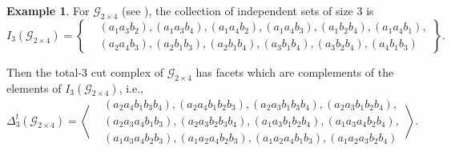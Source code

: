 \documentclass[11pt,reqno,a4paper]{amsart}
\theoremstyle{definition}
\newtheorem{example}{Example}[definition]
\theoremstyle{theorem}
\newcommand{\totalthreecut}{\Delta_{3}^t}
\newcommand{\lno}{\left(}
\newcommand{\rno}{\right)}
\newcommand{\lcu}{\left\{}
\newcommand{\rcu}{\right\}}
\theoremstyle{remark}
\begin{document}
    

\begin{example}
    For $\mathcal{G}_{2\times4}$ (see ), the collection of independent sets of size $3$ is
    $$I_3 \lno \mathcal{G}_{2\times4} \rno = \lcu \begin{split}
        &\lno a_1 a_3 b_2 \rno, \lno a_1 a_3 b_4 \rno, \lno a_1 a_4 b_2 \rno, \lno a_1 a_4 b_3 \rno, \lno a_1 b_2 b_4 \rno, \lno a_1 a_4 b_1 \rno,\\
        &\lno a_2 a_4 b_3 \rno, \lno a_2 b_1 b_3 \rno, \lno a_2 b_1 b_4 \rno, \lno a_3 b_1 b_4 \rno, \lno a_3 b_2 b_4 \rno, \lno a_4 b_1 b_3 \rno
    \end{split} \rcu.
    $$
    
    Then the total-3 cut complex of $\mathcal{G}_{2\times4}$ has facets which are complements of the elements of $I_3 \lno \mathcal{G}_{2\times4} \rno$, i.e., $$\totalthreecut \lno \mathcal{G}_{2\times4} \rno = \left\langle \begin{split}
        &\lno a_2 a_4 b_1 b_3 b_4 \rno,
        \lno a_2 a_4 b_1 b_2 b_3 \rno,
        \lno a_2 a_3 b_1 b_3 b_4 \rno,
        \lno a_2 a_3 b_1 b_2 b_4 \rno,\\
        &\lno a_2 a_3 a_4 b_1 b_3 \rno,
        \lno a_2 a_3 b_2 b_3 b_4 \rno,
        \lno a_1 a_3 b_1 b_2 b_4 \rno,
        \lno a_1 a_3 a_4 b_2 b_4 \rno,\\
        &\lno a_1 a_3 a_4 b_2 b_3 \rno,
        \lno a_1 a_2 a_4 b_2 b_3 \rno,
        \lno a_1 a_2 a_4 b_1 b_3 \rno,
        \lno a_1 a_2 a_3 b_2 b_4 \rno
    \end{split} \right\rangle.$$
\end{example}
\end{document}
